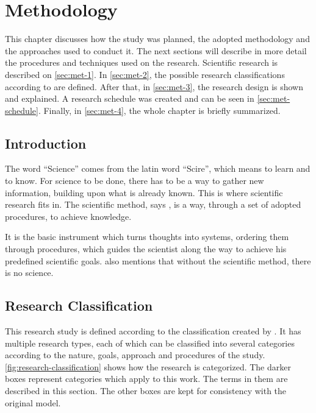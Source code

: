 \chapter{Methodology}\label{methodology}

This chapter discusses how the study was planned, the adopted methodology and the approaches used to conduct it. The next sections will describe in more detail the procedures and techniques used on the research. Scientific research is described on \autoref{sec:met-1}. In \autoref{sec:met-2}, the possible research classifications according to \cite{Prodanov:2013} are defined. After that, in \autoref{sec:met-3}, the research design is shown and explained. A research schedule was created and can be seen in \autoref{sec:met-schedule}. Finally, in \autoref{sec:met-4}, the whole chapter is briefly summarized.

\section{Introduction}\label{sec:met-1}

The word ``Science'' comes from the latin word ``Scire'', which means to learn and to know. For science to be done, there has to be a way to gather new information, building upon what is already known. This is where scientific research fits in. The scientific method, says \cite{Prodanov:2013}, is a way, through a set of adopted procedures, to achieve knowledge.

It is the basic instrument which turns thoughts into systems, ordering them through procedures, which guides the scientist along the way to achieve his predefined scientific goals. \cite{Prodanov:2013} also mentions that without the scientific method, there is no science.

\section{Research Classification}\label{sec:met-2}

This research study is defined according to the classification created by \cite{Prodanov:2013}. It has multiple research types, each of which can be classified into several categories according to the nature, goals, approach and procedures of the study. \autoref{fig:research-classification} shows how the research is categorized. The darker boxes represent categories which apply to this work. The terms in them are described in this section. The other boxes are kept for consistency with the original model.

